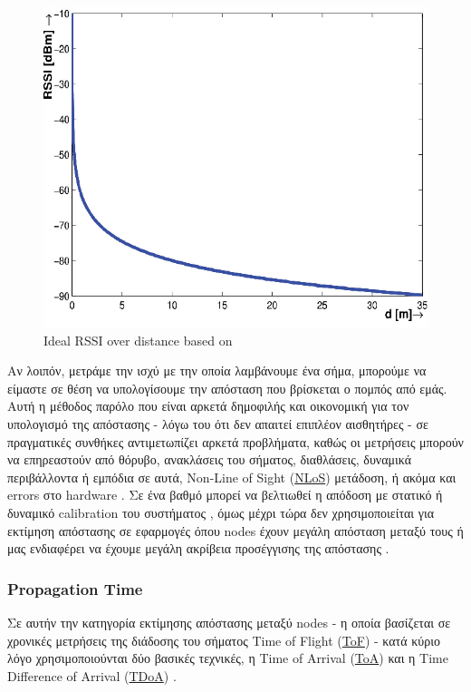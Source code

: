 \begin{figure} [H]
	\centering
	\includegraphics[scale=0.32]{Images/Theoretical-Background/Ideal-RSSI-over-distance.png}
	\decoRule
	\caption[Ideal RSSI over distance]{Ideal RSSI over distance based on \cite{ideal-rssi-model}}
	\label{fig:Ideal-RSSI-over-distance}
\end{figure}

Αν λοιπόν, μετράμε την ισχύ με την οποία λαμβάνουμε ένα σήμα, μπορούμε να είμαστε σε θέση να υπολογίσουμε την απόσταση που βρίσκεται
ο πομπός από εμάς.
Αυτή η μέθοδος παρόλο που είναι αρκετά δημοφιλής και οικονομική για τον υπολο\-γισμό της απόστασης
- λόγω του ότι δεν απαιτεί επιπλέον αισθητήρες - σε πρα\-γματικές 
συνθήκες αντιμετωπίζει αρκετά προβλήματα, καθώς οι μετρήσεις μπορούν να επηρεαστούν από θόρυβο,
ανακλάσεις του σήματος, διαθλάσεις, δυναμικά περιβάλλοντα ή εμπόδια σε αυτά, Non-Line of Sight (\hyperref[abbr:NLoS]{NLoS}) μετάδοση, 
ή ακόμα και errors στο hardware 
\cite{wsn-Localization-systems} \cite{ideal-rssi-model}.
Σε ένα βαθμό μπορεί να βελτιωθεί η απόδοση με στατικό ή δυναμικό calibration του συστήματος ,
όμως μέχρι τώρα δεν χρησιμοποιείται για εκτίμηση απόστασης σε εφαρμογές όπου nodes έχουν μεγάλη
απόσταση μεταξύ τους ή μας ενδιαφέρει να έχουμε μεγάλη ακρίβεια προσέγγισης της απόστασης \cite{ideal-rssi-model}.

\subsubsection{Propagation Time}
Σε αυτήν την κατηγορία εκτίμησης απόστασης μεταξύ nodes - η οποία βασίζεται σε χρονικές μετρήσεις της διάδοσης του σήματος Time of Flight (\hyperref[abbr:ToF]{ToF})
- κατά κύριο λόγο χρησιμοποιούνται δύο βασικές τεχνικές, η Time of Arrival (\hyperref[abbr:ToA]{ToA}) και η Time 
Difference of Arrival (\hyperref[abbr:TDoA]{TDoA}) \cite{wsn-Localization-systems}. 

